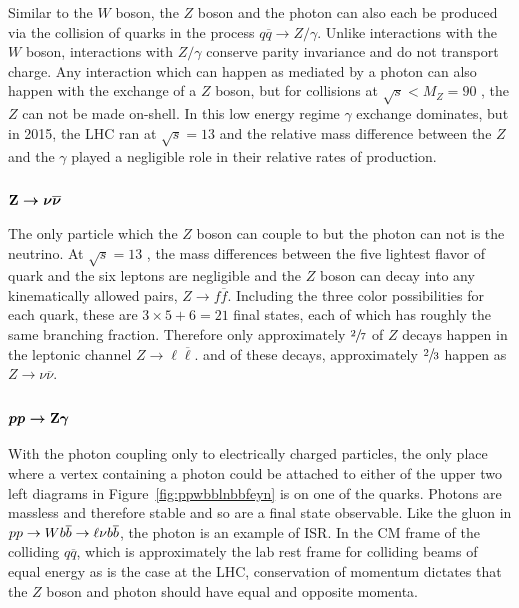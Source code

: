  Similar to the $W$ boson, the $Z$ boson and the photon can
  also each be produced via the collision of quarks in
  the process $q\overline{q} \rightarrow Z/\gamma$.
 Unlike interactions with the $W$ boson, 
  interactions with $Z/\gamma$ conserve parity invariance
  and do not transport charge.
 Any interaction which can happen as mediated
  by a photon can also happen with the exchange
  of a $Z$ boson, but for collisions at $\sqrt{s}<M_Z = 90$ \GeV,
  the $Z$ can not be made on-shell.
 In this low energy regime $\gamma$ exchange dominates,
  but in 2015, the LHC ran at $\sqrt{s}=13$ \TeV
  and the relative mass difference between the $Z$ and the $\gamma$
  played a negligible role in their relative rates of production. 


 \subsection[\znn]
 {$\boldsymbol{\mathrm{Z}\rightarrow\nu\overline{\nu}}$}

 The only particle which the $Z$ boson can couple to 
  but the photon can not is the neutrino.
 At $\sqrt{s}=13$ \TeV, the mass differences between
  the five lightest flavor of quark and the six 
  leptons are negligible and the $Z$ boson
  can decay into any kinematically allowed pairs,
  $Z\rightarrow f\overline{f}$.
 Including the three color possibilities
  for each quark, these are $3\times 5 + 6 = 21$ final states,
  each of which has roughly the same branching
  fraction. 
 Therefore only approximately $\sfrac{2}{7}$ of $Z$
  decays happen in the leptonic channel $Z\rightarrow \ell \overline{\ell}$.
  and of these decays, approximately $\sfrac{2}{3}$ happen
  as $Z\rightarrow \nu\overline{\nu}$.

 \subsection[\ppzg]
 {$\boldsymbol{pp\rightarrow \mathrm{Z}\gamma}$}

 With the photon coupling only to 
  electrically charged particles,
  the only place where a vertex
  containing a photon could be attached to
  either of the upper two left diagrams
  in Figure~\ref{fig:ppwbblnbbfeyn}
  is on one of the quarks.
 Photons are massless and therefore stable
  and so are a final state observable.
 Like the gluon in $pp\rightarrow Wb\overline{b}\rightarrow\ell\nu b\overline{b}$,
  the photon is an example of ISR.
 In the CM frame of the colliding $q\overline{q}$,
  which is approximately the lab rest frame
  for colliding beams of equal energy as is the
  case at the LHC,
  conservation of momentum dictates
  that the $Z$ boson and photon should have 
  equal and opposite momenta.


